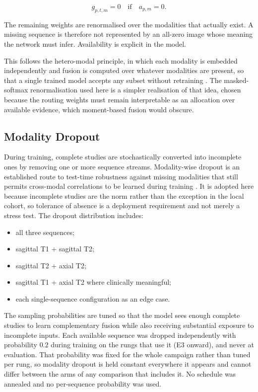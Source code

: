 \begin{equation}
g_{p,t,m}=0 \quad \mathrm{if}\quad a_{p,m}=0.
\label{eq:routing-missing-mask}
\end{equation}

The remaining weights are renormalised over the modalities that actually
exist. A missing sequence is therefore not represented by an all-zero image
whose meaning the network must infer. Availability is explicit in the model.

This follows the hetero-modal principle, in which each modality is embedded
independently and fusion is computed over whatever modalities are present, so
that a single trained model accepts any subset without retraining
\cite{havaei2016hemis}. The masked-softmax renormalisation used here is a
simpler realisation of that idea, chosen because the routing weights must
remain interpretable as an allocation over available evidence, which
moment-based fusion would obscure.

\subsection{Modality Dropout}
\label{sec:method-modality-dropout}

During training, complete studies are stochastically converted into incomplete
ones by removing one or more sequence streams. Modality-wise dropout is an
established route to test-time robustness against missing modalities that still
permits cross-modal correlations to be learned during training
\cite{neverova2016moddrop}. It is adopted here because incomplete studies are
the norm rather than the exception in the local cohort, so tolerance of absence
is a deployment requirement and not merely a stress test. The dropout
distribution includes:

\begin{itemize}
  \item all three sequences;
  \item sagittal T1 + sagittal T2;
  \item sagittal T2 + axial T2;
  \item sagittal T1 + axial T2 where clinically meaningful;
  \item each single-sequence configuration as an edge case.
\end{itemize}

The sampling probabilities are tuned so that the model sees enough complete
studies to learn complementary fusion while also receiving substantial exposure
to incomplete inputs. Each available sequence was dropped independently with
probability $0.2$ during training on the rungs that use it (E3 onward), and never
at evaluation. That probability was fixed for the whole campaign rather than
tuned per rung, so modality dropout is held constant everywhere it appears and
cannot differ between the arms of any comparison that includes it. No schedule
was annealed and no per-sequence probability was used.

